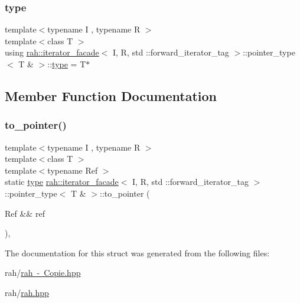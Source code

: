 \subsubsection{\texorpdfstring{type}{type}\hspace{0.1cm}{\footnotesize\ttfamily [2/2]}}
{\footnotesize\ttfamily template$<$typename I , typename R $>$ \\
template$<$class T $>$ \\
using \mbox{\hyperlink{structrah_1_1iterator__facade}{rah\+::iterator\+\_\+facade}}$<$ I, R, std \+::forward\+\_\+iterator\+\_\+tag $>$\+::pointer\+\_\+type$<$ T \& $>$\+::\mbox{\hyperlink{structrah_1_1iterator__facade_3_01_i_00_01_r_00_01std_01_1_1forward__iterator__tag_01_4_1_1pointer__type_3_01_t_01_6_01_4_ab3c8d96b3dedfcf07cab8889136ca353}{type}} =  T$\ast$}



\subsection{Member Function Documentation}
\mbox{\label{structrah_1_1iterator__facade_3_01_i_00_01_r_00_01std_01_1_1forward__iterator__tag_01_4_1_1pointer__type_3_01_t_01_6_01_4_abc4075429345bf67b59bd1bd6477e4d8}} 
\subsubsection{\texorpdfstring{to\_pointer()}{to\_pointer()}}
{\footnotesize\ttfamily template$<$typename I , typename R $>$ \\
template$<$class T $>$ \\
template$<$typename Ref $>$ \\
static \mbox{\hyperlink{structrah_1_1iterator__facade_3_01_i_00_01_r_00_01std_01_1_1forward__iterator__tag_01_4_1_1pointer__type_3_01_t_01_6_01_4_ab3c8d96b3dedfcf07cab8889136ca353}{type}} \mbox{\hyperlink{structrah_1_1iterator__facade}{rah\+::iterator\+\_\+facade}}$<$ I, R, std \+::forward\+\_\+iterator\+\_\+tag $>$\+::pointer\+\_\+type$<$ T \& $>$\+::to\+\_\+pointer (\begin{DoxyParamCaption}\item[{Ref \&\&}]{ref }\end{DoxyParamCaption})\hspace{0.3cm}{\ttfamily [inline]}, {\ttfamily [static]}}



The documentation for this struct was generated from the following files\+:\begin{DoxyCompactItemize}
\item 
rah/\mbox{\hyperlink{rah_01-_01_copie_8hpp}{rah -\/ Copie.\+hpp}}\item 
rah/\mbox{\hyperlink{rah_8hpp}{rah.\+hpp}}\end{DoxyCompactItemize}
